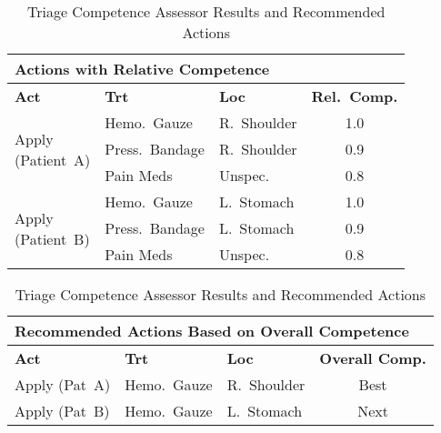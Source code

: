 \documentclass[conference]{IEEEtran}
\begin{document}
\begin{table}[H]
\centering
\footnotesize
\setlength{\tabcolsep}{3pt}
\caption{Triage Competence Assessor Results and Recommended Actions}
\label{tab:triage_competence_combined}

\begin{tabular}{l l l c}
\hline
\multicolumn{4}{l}{\textbf{Actions with Relative Competence}}\\
\hline
\textbf{Act} & \textbf{Trt} & \textbf{Loc} & \textbf{Rel.\ Comp.} \\
\hline
\multirow{3}{*}{\parbox{1.2cm}{Apply\\(Patient~A)}} 
 & Hemo.\ Gauze  & R.\ Shoulder & 1.0 \\
 & Press.\ Bandage & R.\ Shoulder & 0.9 \\
 & Pain Meds     & Unspec.      & 0.8 \\
\hline
\multirow{3}{*}{\parbox{1.2cm}{Apply\\(Patient~B)}} 
 & Hemo.\ Gauze  & L.\ Stomach  & 1.0 \\
 & Press.\ Bandage & L.\ Stomach  & 0.9 \\
 & Pain Meds     & Unspec.      & 0.8 \\
\hline
\end{tabular}

\vspace{1em}  %

\begin{tabular}{l l l c}
\hline
\multicolumn{4}{l}{\textbf{Recommended Actions Based on Overall Competence}}\\
\hline
\textbf{Act} & \textbf{Trt} & \textbf{Loc} & \textbf{Overall Comp.} \\
\hline
Apply (Pat~A) & Hemo.\ Gauze & R.\ Shoulder & Best \\
\hline
Apply (Pat~B) & Hemo.\ Gauze & L.\ Stomach  & Next \\
\hline
\end{tabular}
\end{table}
\end{document}
